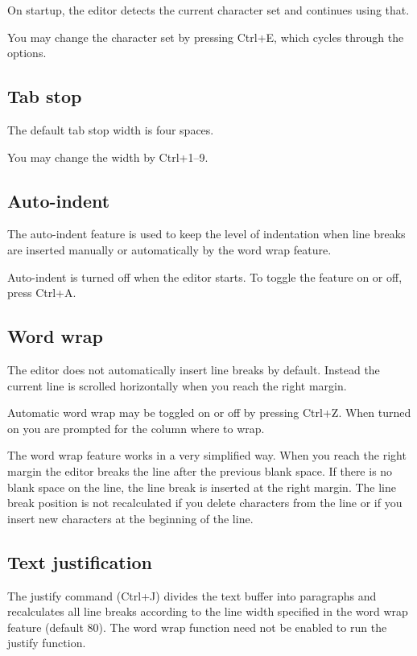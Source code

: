\documentclass{article}
\begin{document}
        On startup, the editor detects the current character set and continues using that.

        You may change the character set by pressing Ctrl+E, which cycles through the options.

    \subsection{Tab stop}
        The default tab stop width is four spaces. 
        
        You may change the width by Ctrl+1--9.
                
    \subsection{Auto-indent}
        The auto-indent feature is used to keep the level of indentation when line breaks are inserted manually or automatically by
        the word wrap feature.

        Auto-indent is turned off when the editor starts. To toggle the feature on or off, press Ctrl+A.

    \subsection{Word wrap}
        The editor does not automatically insert line breaks by default. Instead the current line is scrolled horizontally
        when you reach the right margin.

        Automatic word wrap may be toggled on or off by pressing Ctrl+Z. When turned on you are prompted for the column
        where to wrap.

        The word wrap feature works in a very simplified way. When you reach the right margin the editor breaks the
        line after the previous blank space. If there is no blank space on the line, the line break is inserted
        at the right margin. The line break position is not recalculated if you delete characters from the line
        or if you insert new characters at the beginning of the line.

    \subsection{Text justification}
        The justify command (Ctrl+J) divides the text buffer into paragraphs and recalculates all line breaks
        according to the line width specified in the word wrap feature (default 80). The word wrap function 
        need not be enabled to run the justify function.
          
\end{document}
